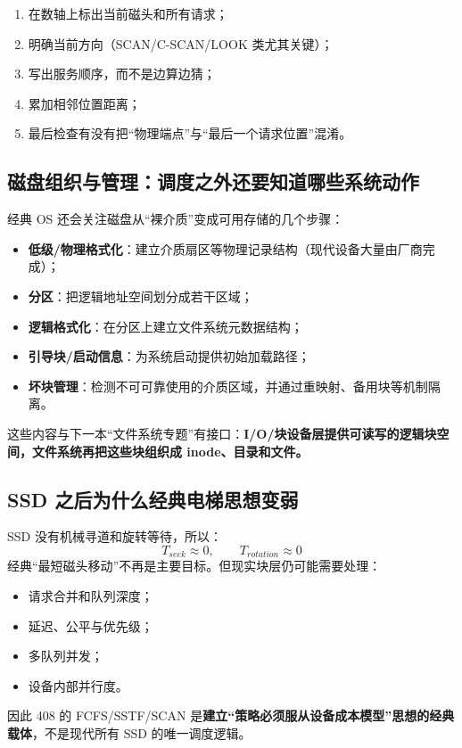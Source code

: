 \documentclass[UTF8,fontset=fandol,11pt,a4paper]{ctexart}
\newcommand{\kw}[1]{\textbf{#1}}
\begin{document}
\begin{method}[磁盘调度题五步法]
\begin{enumerate}
  \item 在数轴上标出当前磁头和所有请求；
  \item 明确当前方向（SCAN/C-SCAN/LOOK 类尤其关键）；
  \item 写出服务顺序，而不是边算边猜；
  \item 累加相邻位置距离；
  \item 最后检查有没有把“物理端点”与“最后一个请求位置”混淆。
\end{enumerate}
\end{method}

\subsection{磁盘组织与管理：调度之外还要知道哪些系统动作}
经典 OS 还会关注磁盘从“裸介质”变成可用存储的几个步骤：
\begin{itemize}
  \item \kw{低级/物理格式化}：建立介质扇区等物理记录结构（现代设备大量由厂商完成）；
  \item \kw{分区}：把逻辑地址空间划分成若干区域；
  \item \kw{逻辑格式化}：在分区上建立文件系统元数据结构；
  \item \kw{引导块/启动信息}：为系统启动提供初始加载路径；
  \item \kw{坏块管理}：检测不可可靠使用的介质区域，并通过重映射、备用块等机制隔离。
\end{itemize}
这些内容与下一本“文件系统专题”有接口：\kw{I/O/块设备层提供可读写的逻辑块空间，文件系统再把这些块组织成 inode、目录和文件。}

\subsection{SSD 之后为什么经典电梯思想变弱}
SSD 没有机械寻道和旋转等待，所以：
\[
T_{seek}\approx 0,\qquad T_{rotation}\approx 0
\]
经典“最短磁头移动”不再是主要目标。但现实块层仍可能需要处理：
\begin{itemize}
  \item 请求合并和队列深度；
  \item 延迟、公平与优先级；
  \item 多队列并发；
  \item 设备内部并行度。
\end{itemize}
因此 408 的 FCFS/SSTF/SCAN 是\kw{建立“策略必须服从设备成本模型”思想的经典载体}，不是现代所有 SSD 的唯一调度逻辑。
\end{document}
